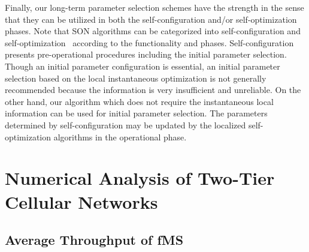 \documentclass[journal]{IEEEtran}
\begin{document}
Finally, our long-term parameter selection schemes have
the strength in the sense that they can be utilized
in both the self-configuration and/or self-optimization phases.
Note that SON algorithms can be categorized into self-configuration and self-optimization~\cite{3gppTS36.3.9}
according to the functionality and phases.
Self-configuration presents pre-operational procedures including
the initial parameter selection.
Though an initial parameter configuration is essential, an initial parameter
selection based on the local instantaneous optimization is not generally recommended
 because the information is very insufficient and unreliable.
 On the other hand, our algorithm which does not require the instantaneous local information can be used
 for initial parameter selection. The parameters
 determined by self-configuration  may be updated by the localized self-optimization algorithms in the operational phase.

\section{Numerical Analysis of Two-Tier Cellular Networks}
\label{sec:analysis}
\subsection{Average Throughput of fMS}
\label{sec:femto_model}
\end{document}
